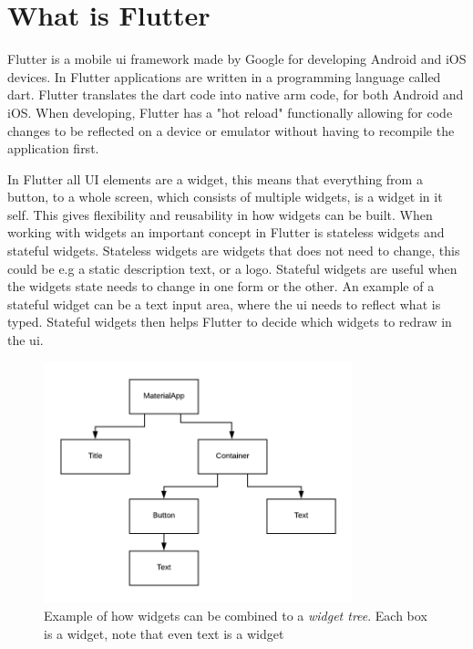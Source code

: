 \section{What is Flutter}


Flutter is a mobile \gls{ui} framework made by Google for developing Android and iOS devices\cite{flutterFAQ}. In Flutter applications  are written in a programming language called dart. Flutter translates the dart code into native arm code, for both Android and iOS.
When developing, Flutter has a "hot reload" functionally allowing for code changes to be reflected on a device or emulator without having to recompile the application first.

In Flutter all UI elements are a widget, this means that everything from a  button, to a  whole screen, which consists of multiple widgets, is a widget in it self. This gives flexibility and reusability in how widgets can be built. When working with widgets an important concept in Flutter is stateless widgets and stateful widgets. Stateless widgets are widgets that does not need to change, this could be  e.g a static description text, or a logo. Stateful widgets are useful when the widgets state needs to change in one form or the other.  An example of a stateful widget can be a text input area, where the \gls{ui} needs to reflect what is typed. Stateful widgets then helps Flutter to decide which widgets to redraw in the \gls{ui}.

\begin{figure}[h]
    \centering
    \includegraphics[width=0.8\textwidth]{figures/WidgetTree.png}
    \caption{Example of how widgets can be combined to a \textit{widget tree}. Each box is a widget, note that even text is a widget}
    \label{fig:WidgetTree}
\end{figure}

